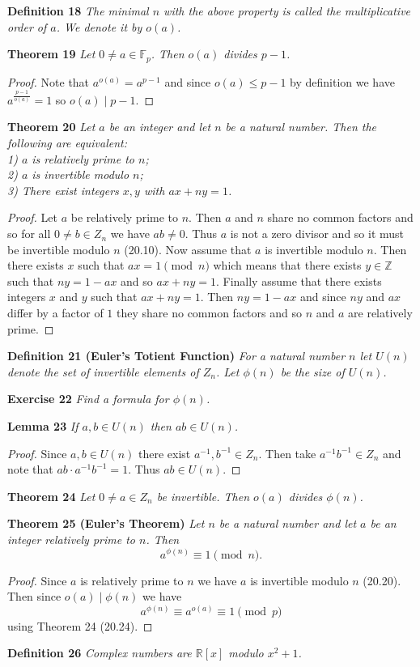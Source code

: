 \documentclass{article}
\begin{document}
\begin{flushleft}
\textbf{Definition 18}
\textsl{The minimal $n$ with the above property is called the multiplicative order of $a$. We denote it by $o(a)$.}

\textbf{Theorem 19}
\textsl{Let $0 \neq a \in \mathbb{F}_p$. Then $o(a)$ divides $p-1$.}
\begin{proof}
Note that $a^{o(a)} = a^{p-1}$ and since $o(a) \leq p-1$ by definition we have $a^{\frac{p-1}{o(a)}} = 1$ so $o(a) \mid p-1$.
\end{proof}

\textbf{Theorem 20}
\textsl{Let $a$ be an integer and let $n$ be a natural number. Then the following are equivalent:\\
1) $a$ is relatively prime to $n$; \\
2) $a$ is invertible modulo $n$; \\
3) There exist integers $x,y$ with $ax+ny=1$.}
\begin{proof}
Let $a$ be relatively prime to $n$. Then $a$ and $n$ share no common factors and so for all $0 \neq b \in Z_n$ we have $ab \neq 0$. Thus $a$ is not a zero divisor and so it must be invertible modulo $n$ (20.10). Now assume that $a$ is invertible modulo $n$. Then there exists $x$ such that $ax = 1 \pmod{n}$ which means that there exists $y \in \mathbb{Z}$ such that $ny = 1 - ax$ and so $ax + ny = 1$. Finally assume that there exists integers $x$ and $y$ such that $ax + ny = 1$. Then $ny = 1 - ax$ and since $ny$ and $ax$ differ by a factor of $1$ they share no common factors and so $n$ and $a$ are relatively prime.
\end{proof}

\textbf{Definition 21 (Euler's Totient Function)}
\textsl{For a natural number $n$ let $U(n)$ denote the set of invertible elements of $Z_n$. Let $\phi(n)$ be the size of $U(n)$.}\newline

\textbf{Exercise 22}
\textsl{Find a formula for $\phi(n)$.}\newline

\textbf{Lemma 23}
\textsl{If $a,b \in U(n)$ then $ab \in U(n)$.}
\begin{proof}
Since $a,b \in U(n)$ there exist $a^{-1}, b^{-1} \in Z_n$. Then take $a^{-1}b^{-1} \in Z_n$ and note that $ab \cdot a^{-1}b^{-1} = 1$. Thus $ab \in U(n)$.
\end{proof}

\textbf{Theorem 24}
\textsl{Let $0 \neq a \in Z_n$ be invertible. Then $o(a)$ divides $\phi(n)$.}

\textbf{Theorem 25 (Euler's Theorem)}
\textsl{Let $n$ be a natural number and let $a$ be an integer relatively prime to $n$. Then
\[
a^{\phi(n)} \equiv 1 \pmod{n}.
\]}
\begin{proof}
Since $a$ is relatively prime to $n$ we have $a$ is invertible modulo $n$ (20.20). Then since $o(a) \mid \phi(n)$ we have
\[
a^{\phi(n)} \equiv a^{o(a)} \equiv 1 \pmod{p}
\]
using Theorem 24 (20.24).
\end{proof}

\textbf{Definition 26}
\textsl{Complex numbers are $\mathbb{R}[x]$ modulo $x^2 + 1$.}

\end{flushleft}
\end{document}
